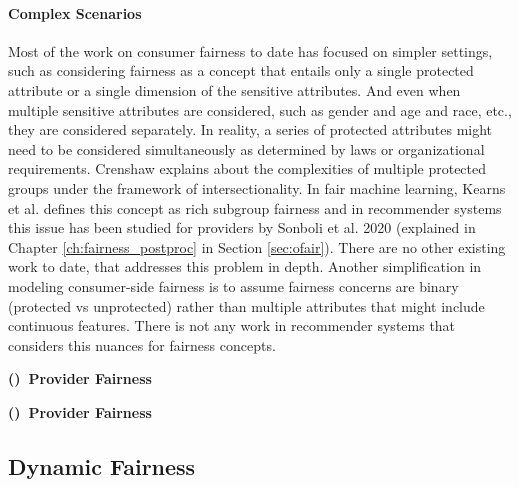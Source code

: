             \vspace{0.25cm}
            \noindent \paragraph{Complex Scenarios}
            \vspace{0.25cm}
                Most of the work on consumer fairness to date has focused on simpler settings, such as considering fairness as a concept that entails only a single protected attribute or a single dimension of the sensitive attributes. And even when multiple sensitive attributes are considered, such as gender and age and race, etc., they are considered separately. In reality, a series of protected attributes might need to be considered simultaneously as determined by laws or organizational requirements. Crenshaw \cite{crenshaw1989demarginalizing} explains about the complexities of multiple protected groups under the framework of intersectionality. In fair machine learning, Kearns et al. \cite{kearns2019empirical} defines this concept as rich subgroup fairness and in recommender systems this issue has been studied for providers by Sonboli et al. 2020 \cite{sonboli2020opportunistic}  (explained in Chapter \ref{ch:fairness_postproc} in Section \ref{sec:ofair}). There are no other existing work to date, that addresses this problem in depth. Another simplification in modeling consumer-side fairness is to assume fairness concerns are binary (protected vs unprotected) rather than multiple attributes that might include continuous features. There is not any work in recommender systems that considers this nuances for fairness concepts.

        \textbf{()~Provider Fairness}


        \textbf{()~Provider Fairness}









    \subsection{Dynamic Fairness}

